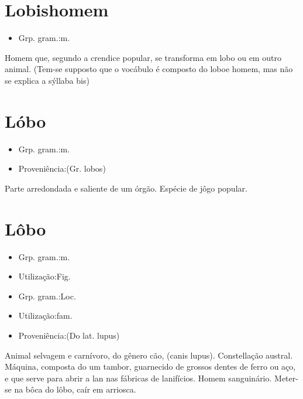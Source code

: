 \section{Lobishomem}
\begin{itemize}
\item {Grp. gram.:m.}
\end{itemize}
Homem que, segundo a crendice popular, se transforma em lobo ou em outro animal.
(Tem-se supposto que o vocábulo é composto do \textunderscore lobo\textunderscore  e \textunderscore homem\textunderscore , mas não se explica a sýllaba \textunderscore bis\textunderscore )
\section{Lóbo}
\begin{itemize}
\item {Grp. gram.:m.}
\end{itemize}
\begin{itemize}
\item {Proveniência:(Gr. \textunderscore lobos\textunderscore )}
\end{itemize}
Parte arredondada e saliente de um órgão.
Espécie de jôgo popular.
\section{Lôbo}
\begin{itemize}
\item {Grp. gram.:m.}
\end{itemize}
\begin{itemize}
\item {Utilização:Fig.}
\end{itemize}
\begin{itemize}
\item {Grp. gram.:Loc.}
\end{itemize}
\begin{itemize}
\item {Utilização:fam.}
\end{itemize}
\begin{itemize}
\item {Proveniência:(Do lat. \textunderscore lupus\textunderscore )}
\end{itemize}
Animal selvagem e carnívoro, do gênero cão, (\textunderscore canis lupus\textunderscore ).
Constellação austral.
Máquina, composta do um tambor, guarnecido de grossos dentes de ferro ou aço, e que serve para abrir a lan nas fábricas de lanifícios.
Homem sanguinário.
\textunderscore Meter-se na bôca do lôbo\textunderscore , caír em arriosca.
